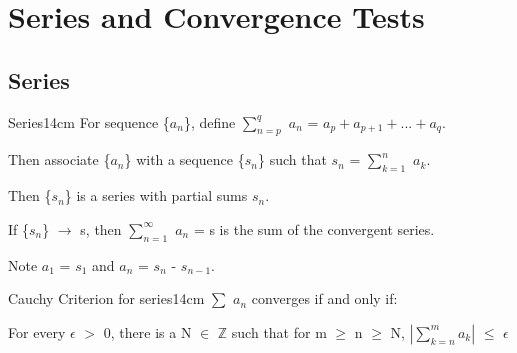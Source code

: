 \newpage

\section[Day 10: Series \& Convergence Tests]{ Series and Convergence Tests }

\subsection{ Series }

    \begin{definition}{Series}{14cm}
        For sequence \{$a_n$\}, define $\sum_{n=p}^q$ $a_n$
        = $a_p + a_{p+1} + ... + a_q$.

        Then associate \{$a_n$\} with a sequence \{$s_n$\}
        such that $s_n$ = $\sum_{k=1}^n$ $a_k$.

        Then \{$s_n$\} is a series with partial sums $s_n$.

        If \{$s_n$\} $\rightarrow$ s, then
        $\sum_{n=1}^{\infty}$ $a_n$ = s
        is the sum of the convergent series.
        
        Note $a_1$ = $s_1$ and $a_n$ = $s_n$ - $s_{n-1}$.
    \end{definition}

    \vspace{0.5cm}



    \begin{wtheorem}{Cauchy Criterion for series}{14cm}
        $\sum$ $a_n$ converges if and only if:
        
        \hspace{0.5cm}
        For every $\epsilon$ $>$ 0, there is a N $\in$ $\mathbb{Z}$
        such that for m $\geq$ n $\geq$ N,
        $| \sum_{k=n}^m a_k |$ $\leq$ $\epsilon$
    \end{wtheorem}

